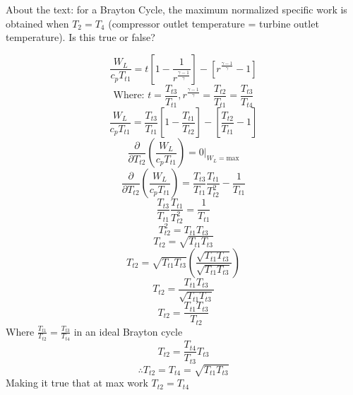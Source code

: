 \documentclass[12pt]{exam}
\begin{document}
\begin{questions}
\newpage 
\begin{question}
About the text: for a Brayton Cycle, the maximum normalized specific work is obtained
when \(T_2 = T_4\) (compressor outlet temperature = turbine outlet temperature). Is this true
or false? 
\end{question}
\begin{equation}
  \frac{W_L}{c_p T_{t1}} = t \left[1-\frac{1}{r^{\frac{\gamma-1}{\gamma}}}\right] - \left[r^{\frac{\gamma-1}{\gamma}} -1\right]
\end{equation}
\begin{equation*}
  \text{Where: } t = \frac{T_{t3}}{T_{t1}}, r^{\frac{\gamma-1}{\gamma}} = \frac{T_{t2}}{T_{t1}} = \frac{T_{t3}}{T_{t4}}
\end{equation*}
\begin{equation}
  \frac{W_L}{c_p T_{t1}} = \frac{T_{t3}}{T_{t1}} \left[1-\frac{T_{t1}}{T_{t2}}\right] - \left[\frac{T_{t2}}{T_{t1}} -1\right]
\end{equation}
\begin{equation*}
  \frac{\partial}{\partial T_{t2}} \left(\frac{W_L}{c_p T_{t1}}\right) =  0 |_{W_L = \text{max}}
\end{equation*}
\begin{equation*}
  \frac{\partial}{\partial T_{t2}} \left(\frac{W_L}{c_p T_{t1}}\right) = \frac{T_{t3}}{T_{t1}} \frac{T_{t1}}{T^2_{t2}} - \frac{1}{T_{t1}}
\end{equation*}
\begin{equation*}
  \frac{T_{t3}}{T_{t1}} \frac{T_{t1}}{T^2_{t2}} = \frac{1}{T_{t1}}
\end{equation*}
\begin{equation*}
  T^2_{t2} = T_{t1}T_{t3}
\end{equation*}
\begin{equation}
  T_{t2} = \sqrt{T_{t1}T_{t3}}
\end{equation}
\begin{equation*}
  T_{t2} = \sqrt{T_{t1}T_{t3}}\left(\frac{\sqrt{T_{t1}T_{t3}}}{\sqrt{T_{t1}T_{t3}}}\right)
\end{equation*}
\begin{equation*}
  T_{t2} = \frac{{T_{t1}T_{t3}}}{\sqrt{T_{t1}T_{t3}}}
\end{equation*}
\begin{equation*}
  T_{t2} = \frac{{T_{t1}T_{t3}}}{T_{t2}}
\end{equation*}
Where \(\frac{T_{t1}}{T_{t2}} = \frac{T_{t3}}{T_{t4}}\) in an ideal Brayton cycle
\begin{equation*}
  T_{t2} = \frac{{T_{t4}}}{T_{t3}} T_{t3}
\end{equation*}
\begin{equation}
  \therefore T_{t2} = T_{t4} = \sqrt{T_{t1}T_{t3}}
\end{equation}
Making it true that at max work \(T_{t2} = T_{t4}\)

\end{questions}
\end{document}
